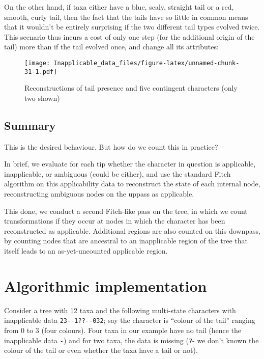 \documentclass[]{book}
\theoremstyle{definition}
\theoremstyle{definition}
\theoremstyle{definition}
\theoremstyle{remark}
\begin{document}
On the other hand, if taxa either have a blue, scaly, straight tail or a
red, smooth, curly tail, then the fact that the tails have so little in
common means that it wouldn't be entirely surprising if the two
different tail types evolved twice. This scenario thus incurs a cost of
only one step (for the additional origin of the tail) more than if the
tail evolved once, and change all its attributes:

\begin{figure}
\centering
\texttt{[image: Inapplicable\_data\_files/figure-latex/unnamed-chunk-31-1.pdf]}
\caption{\label{fig:unnamed-chunk-31}Reconstructions of tail presence and
five contingent characters (only two shown)}
\end{figure}

\subsection{Summary}\label{summary}

This is the desired behaviour. But how do we count this in practice?

In brief, we evaluate for each tip whether the character in question is
applicable, inapplicable, or ambiguous (could be either), and use the
standard Fitch algorithm on this applicability data to reconstruct the
state of each internal node, reconstructing ambiguous nodes on the
uppass as applicable.

This done, we conduct a second Fitch-like pass on the tree, in which we
count transformations if they occur at nodes in which the character has
been reconstructed as applicable. Additional regions are also counted on
this downpass, by counting nodes that are ancestral to an inapplicable
region of the tree that itself leads to an as-yet-uncounted applicable
region.

\hypertarget{algorithm}{\section{Algorithmic
implementation}\label{algorithm}}

Consider a tree with 12 taxa and the following multi-state characters
with inapplicable data \texttt{23-\/-1??-\/-032}; say the character is
``colour of the tail'' ranging from 0 to 3 (four colours). Four taxa in
our example have no tail (hence the inapplicable data \texttt{-}) and
for two taxa, the data is missing (\texttt{?}- we don't known the colour
of the tail or even whether the taxa have a tail or not).
\end{document}
